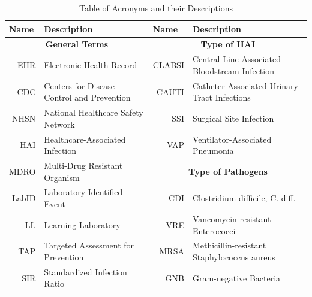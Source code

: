 \begin{table}[]
	\caption{Table of Acronyms and their Descriptions}
	\label{tab1}
	{\footnotesize
		\begin{tabular}{|l|l|r|l|}
			\hline
			\textbf{Name}              & \textbf{Description}                       & \multicolumn{1}{l|}{\textbf{Name}} & \textbf{Description}                               \\ \hline
			\multicolumn{2}{|c|}{\textbf{General Terms}}                            & \multicolumn{2}{c|}{\textbf{Type of HAI}}                                               \\ \hline
			\multicolumn{1}{|r|}{EHR}  & Electronic Health Record                   & CLABSI                             & Central Line-Associated Bloodstream Infection      \\ \hline
			\multicolumn{1}{|r|}{CDC}  & Centers for Disease Control and Prevention & CAUTI                              & Catheter-Associated Urinary Tract Infections       \\ \hline
			\multicolumn{1}{|r|}{NHSN} & National Healthcare Safety Network         & SSI                                & Surgical Site Infection                            \\ \hline
			\multicolumn{1}{|r|}{HAI}  & Healthcare-Associated Infection             & VAP                                & Ventilator-Associated Pneumonia                    \\ \hline
			\multicolumn{1}{|r|}{MDRO} & Multi-Drug Resistant Organism              & \multicolumn{2}{c|}{\textbf{Type of Pathogens}}                                         \\ \hline
			\multicolumn{1}{|r|}{LabID}& Laboratory Identified Event        		& CDI                                & Clostridium difficile, C. diff.                    \\ \hline
			\multicolumn{1}{|r|}{LL}   & Learning Laboratory                        & VRE                                & Vancomycin-resistant Enterococci                   \\ \hline
			\multicolumn{1}{|r|}{TAP}  & Targeted Assessment for Prevention         & MRSA                               & Methicillin-resistant Staphylococcus aureus 	   \\ \hline
			\multicolumn{1}{|r|}{SIR}  & Standardized Infection Ratio               & GNB                                & Gram-negative Bacteria                             \\ \hline
		\end{tabular}
	}
\end{table}


